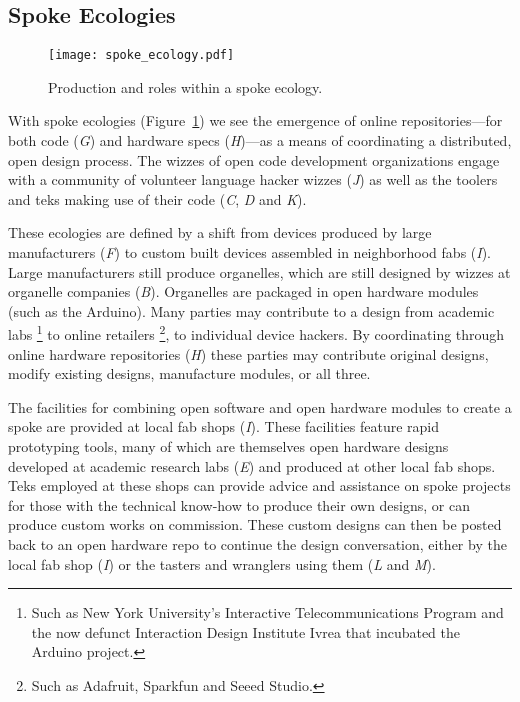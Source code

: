 \subsection{Spoke Ecologies}
%
\begin{figure}[b!]
  \centering
    \texttt{[image: spoke\_ecology.pdf]}
  \caption{Production and roles within a spoke ecology.}
  \label{fig:spoke_ecology}
\end{figure}
%
With spoke ecologies  (Figure~\ref{fig:spoke_ecology}) we see the emergence of online repositories---for both code (\emph{G}) and hardware specs (\emph{H})---as a means of coordinating a distributed, open design process. The wizzes of open code development organizations engage with a community of volunteer language hacker wizzes (\emph{J}) as well as the toolers and teks making use of their code (\emph{C}, \emph{D} and \emph{K}).

These ecologies are defined by a shift from devices produced by large manufacturers (\emph{F}) to custom built devices assembled in neighborhood fabs (\emph{I}). 
Large manufacturers still produce organelles, which are still designed by wizzes at organelle companies (\emph{B}). Organelles are packaged in open hardware modules (such as the Arduino). 
Many parties may contribute to a design from academic labs%
\footnote{Such as New York University's Interactive Telecommunications Program  and the now defunct Interaction Design Institute Ivrea that incubated the Arduino project.}
to online retailers%
\footnote{Such as Adafruit, Sparkfun and Seeed Studio.},
to individual device hackers.
By coordinating through online hardware repositories (\emph{H}) these parties may contribute original designs, modify existing designs, manufacture modules, or all three.

The facilities for combining open software and open hardware modules to create a spoke are provided at local fab shops (\emph{I}).
These facilities feature rapid prototyping tools, many of which are themselves open hardware designs developed at academic research labs (\emph{E}) and produced at other local fab shops.
Teks employed at these shops can provide advice and assistance on spoke projects for those with the technical know-how to produce their own designs, or can produce custom works on commission. 
These custom designs can then be posted back to an open hardware repo to continue the design conversation, either by the local fab shop (\emph{I}) or the tasters and wranglers using them (\emph{L} and \emph{M}).

